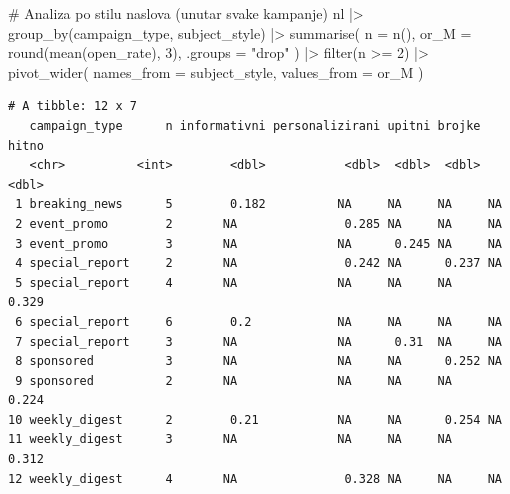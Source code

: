 \documentclass[
  croatian,
  letterpaper,
  DIV=11,
  numbers=noendperiod]{scrartcl}
\newenvironment{Shaded}{\begin{snugshade}}{\end{snugshade}}
\newcommand{\AttributeTok}[1]{\textcolor[rgb]{0.40,0.45,0.13}{#1}}
\newcommand{\CommentTok}[1]{\textcolor[rgb]{0.37,0.37,0.37}{#1}}
\newcommand{\DecValTok}[1]{\textcolor[rgb]{0.68,0.00,0.00}{#1}}
\newcommand{\FunctionTok}[1]{\textcolor[rgb]{0.28,0.35,0.67}{#1}}
\newcommand{\NormalTok}[1]{\textcolor[rgb]{0.00,0.23,0.31}{#1}}
\newcommand{\SpecialCharTok}[1]{\textcolor[rgb]{0.37,0.37,0.37}{#1}}
\newcommand{\StringTok}[1]{\textcolor[rgb]{0.13,0.47,0.30}{#1}}
\begin{document}
\begin{Shaded}
\begin{Highlighting}[]
\CommentTok{\# Analiza po stilu naslova (unutar svake kampanje)}
\NormalTok{nl }\SpecialCharTok{|\textgreater{}}
  \FunctionTok{group\_by}\NormalTok{(campaign\_type, subject\_style) }\SpecialCharTok{|\textgreater{}}
  \FunctionTok{summarise}\NormalTok{(}
    \AttributeTok{n =} \FunctionTok{n}\NormalTok{(),}
    \AttributeTok{or\_M =} \FunctionTok{round}\NormalTok{(}\FunctionTok{mean}\NormalTok{(open\_rate), }\DecValTok{3}\NormalTok{),}
    \AttributeTok{.groups =} \StringTok{"drop"}
\NormalTok{  ) }\SpecialCharTok{|\textgreater{}}
  \FunctionTok{filter}\NormalTok{(n }\SpecialCharTok{\textgreater{}=} \DecValTok{2}\NormalTok{) }\SpecialCharTok{|\textgreater{}}
  \FunctionTok{pivot\_wider}\NormalTok{(}
    \AttributeTok{names\_from =}\NormalTok{ subject\_style,}
    \AttributeTok{values\_from =}\NormalTok{ or\_M}
\NormalTok{  )}
\end{Highlighting}
\end{Shaded}

\begin{verbatim}
# A tibble: 12 x 7
   campaign_type      n informativni personalizirani upitni brojke  hitno
   <chr>          <int>        <dbl>           <dbl>  <dbl>  <dbl>  <dbl>
 1 breaking_news      5        0.182          NA     NA     NA     NA    
 2 event_promo        2       NA               0.285 NA     NA     NA    
 3 event_promo        3       NA              NA      0.245 NA     NA    
 4 special_report     2       NA               0.242 NA      0.237 NA    
 5 special_report     4       NA              NA     NA     NA      0.329
 6 special_report     6        0.2            NA     NA     NA     NA    
 7 special_report     3       NA              NA      0.31  NA     NA    
 8 sponsored          3       NA              NA     NA      0.252 NA    
 9 sponsored          2       NA              NA     NA     NA      0.224
10 weekly_digest      2        0.21           NA     NA      0.254 NA    
11 weekly_digest      3       NA              NA     NA     NA      0.312
12 weekly_digest      4       NA               0.328 NA     NA     NA    
\end{verbatim}
\end{document}
